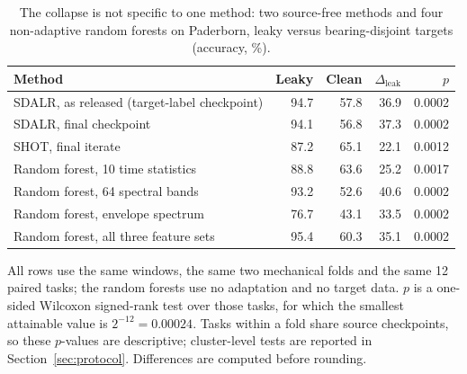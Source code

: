 \begin{table}[htbp]
\centering
\caption{The collapse is not specific to one method: two source-free methods and four non-adaptive random forests on Paderborn, leaky versus bearing-disjoint targets (accuracy, \%).}
\label{tab:methods}
\begin{tabular}{lrrrr}
\toprule
Method & Leaky & Clean & $\Delta_{\mathrm{leak}}$ & $p$ \\
\midrule
SDALR, as released (target-label checkpoint) & 94.7 & 57.8 & 36.9 & 0.0002 \\
SDALR, final checkpoint & 94.1 & 56.8 & 37.3 & 0.0002 \\
SHOT, final iterate & 87.2 & 65.1 & 22.1 & 0.0012 \\
\midrule
Random forest, 10 time statistics & 88.8 & 63.6 & 25.2 & 0.0017 \\
Random forest, 64 spectral bands & 93.2 & 52.6 & 40.6 & 0.0002 \\
Random forest, envelope spectrum & 76.7 & 43.1 & 33.5 & 0.0002 \\
Random forest, all three feature sets & 95.4 & 60.3 & 35.1 & 0.0002 \\
\bottomrule
\end{tabular}
\begin{minipage}{\linewidth}\vspace{2pt}\footnotesize All rows use the same windows, the same two mechanical folds and the same 12 paired tasks; the random forests use no adaptation and no target data. $p$ is a one-sided Wilcoxon signed-rank test over those tasks, for which the smallest attainable value is $2^{-12}=0.00024$. Tasks within a fold share source checkpoints, so these $p$-values are descriptive; cluster-level tests are reported in Section~\ref{sec:protocol}. Differences are computed before rounding.\end{minipage}
\end{table}
